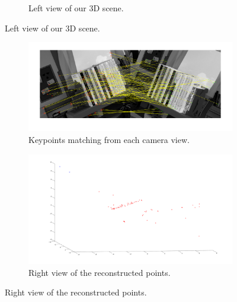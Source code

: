\documentclass[12pt]{article}
\begin{document}
\begin{figure}[htbp]
\begin{subfigure}[b]{0.45\textwidth}
                \caption{Left view of our 3D scene.}
                \label{fig:blender2}
        \end{subfigure}
\end{figure}

\begin{figure}[htbp]
		\ContinuedFloat
		\centering
        \begin{subfigure}[b]{0.45\textwidth}
                \includegraphics[width=\textwidth]{images/reconstructionMatching}
                \caption{Keypoints matching from each camera view.}
                \label{fig:stereoMatching}
        \end{subfigure}
        \begin{subfigure}[b]{0.45\textwidth}
                \includegraphics[width=\textwidth]{images/reconstruction1}
                \caption{Right view of the reconstructed points.}
                \label{fig:stereoRecons1}
        \end{subfigure}
\end{figure}
\end{document}
